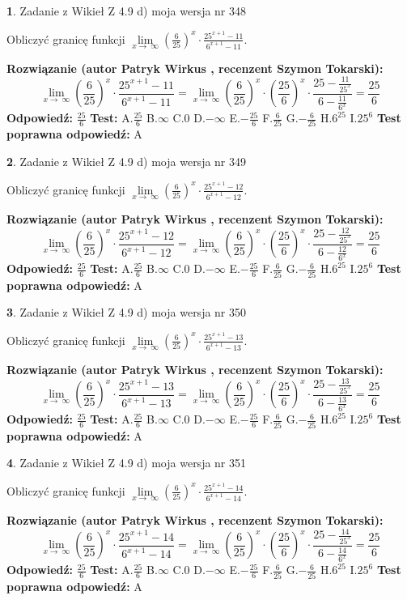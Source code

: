 \documentclass[12pt, a4paper]{article}
\theoremstyle{definition} %
\newtheorem{zad}{}
\newcommand{\zadStart}[1]{\begin{zad}#1\newline}
\newcommand{\zadStop}{\end{zad}}
\newcommand{\rozwStart}[2]{\noindent \textbf{Rozwiązanie (autor #1 , recenzent #2): }\newline}
\newcommand{\rozwStop}{\newline}
\newcommand{\odpStart}{\noindent \textbf{Odpowiedź:}\newline}
\newcommand{\odpStop}{\newline}
\newcommand{\testStart}{\noindent \textbf{Test:}\newline}
\newcommand{\testStop}{\newline}
\newcommand{\kluczStart}{\noindent \textbf{Test poprawna odpowiedź:}\newline}
\newcommand{\kluczStop}{\newline}
\begin{document}
\zadStart{Zadanie z Wikieł Z 4.9 d) moja wersja nr 348}


Obliczyć granicę funkcji  $\lim\limits_{x\to\ \infty}(\frac{6}{25})^{x}\cdot\frac{25^{x+1}-11}{6^{x+1}-11}$.
\zadStop
\rozwStart{Patryk Wirkus}{Szymon Tokarski}
$$\lim\limits_{x\to\ \infty}(\frac{6}{25})^{x}\cdot\frac{25^{x+1}-11}{6^{x+1}-11}=\lim\limits_{x\to\ \infty}(\frac{6}{25})^{x}\cdot(\frac{25}{6})^{x} \cdot \frac{25-\frac{11}{25^{x}}}{6-\frac{11}{6^{x}}} = \frac{25}{6}$$
\rozwStop
\odpStart
$\frac{25}{6}$
\odpStop
\testStart
A.$\frac{25}{6}$ B.$\infty$ C.$0$ D.$-\infty$ E.$-\frac{25}{6}$
F.$\frac{6}{25}$ G.$-\frac{6}{25}$
H.$6^{25}$
I.$25^{6}$
\testStop
\kluczStart
A
\kluczStop



\zadStart{Zadanie z Wikieł Z 4.9 d) moja wersja nr 349}


Obliczyć granicę funkcji  $\lim\limits_{x\to\ \infty}(\frac{6}{25})^{x}\cdot\frac{25^{x+1}-12}{6^{x+1}-12}$.
\zadStop
\rozwStart{Patryk Wirkus}{Szymon Tokarski}
$$\lim\limits_{x\to\ \infty}(\frac{6}{25})^{x}\cdot\frac{25^{x+1}-12}{6^{x+1}-12}=\lim\limits_{x\to\ \infty}(\frac{6}{25})^{x}\cdot(\frac{25}{6})^{x} \cdot \frac{25-\frac{12}{25^{x}}}{6-\frac{12}{6^{x}}} = \frac{25}{6}$$
\rozwStop
\odpStart
$\frac{25}{6}$
\odpStop
\testStart
A.$\frac{25}{6}$ B.$\infty$ C.$0$ D.$-\infty$ E.$-\frac{25}{6}$
F.$\frac{6}{25}$ G.$-\frac{6}{25}$
H.$6^{25}$
I.$25^{6}$
\testStop
\kluczStart
A
\kluczStop



\zadStart{Zadanie z Wikieł Z 4.9 d) moja wersja nr 350}


Obliczyć granicę funkcji  $\lim\limits_{x\to\ \infty}(\frac{6}{25})^{x}\cdot\frac{25^{x+1}-13}{6^{x+1}-13}$.
\zadStop
\rozwStart{Patryk Wirkus}{Szymon Tokarski}
$$\lim\limits_{x\to\ \infty}(\frac{6}{25})^{x}\cdot\frac{25^{x+1}-13}{6^{x+1}-13}=\lim\limits_{x\to\ \infty}(\frac{6}{25})^{x}\cdot(\frac{25}{6})^{x} \cdot \frac{25-\frac{13}{25^{x}}}{6-\frac{13}{6^{x}}} = \frac{25}{6}$$
\rozwStop
\odpStart
$\frac{25}{6}$
\odpStop
\testStart
A.$\frac{25}{6}$ B.$\infty$ C.$0$ D.$-\infty$ E.$-\frac{25}{6}$
F.$\frac{6}{25}$ G.$-\frac{6}{25}$
H.$6^{25}$
I.$25^{6}$
\testStop
\kluczStart
A
\kluczStop



\zadStart{Zadanie z Wikieł Z 4.9 d) moja wersja nr 351}


Obliczyć granicę funkcji  $\lim\limits_{x\to\ \infty}(\frac{6}{25})^{x}\cdot\frac{25^{x+1}-14}{6^{x+1}-14}$.
\zadStop
\rozwStart{Patryk Wirkus}{Szymon Tokarski}
$$\lim\limits_{x\to\ \infty}(\frac{6}{25})^{x}\cdot\frac{25^{x+1}-14}{6^{x+1}-14}=\lim\limits_{x\to\ \infty}(\frac{6}{25})^{x}\cdot(\frac{25}{6})^{x} \cdot \frac{25-\frac{14}{25^{x}}}{6-\frac{14}{6^{x}}} = \frac{25}{6}$$
\rozwStop
\odpStart
$\frac{25}{6}$
\odpStop
\testStart
A.$\frac{25}{6}$ B.$\infty$ C.$0$ D.$-\infty$ E.$-\frac{25}{6}$
F.$\frac{6}{25}$ G.$-\frac{6}{25}$
H.$6^{25}$
I.$25^{6}$
\testStop
\kluczStart
A
\kluczStop
\end{document}
